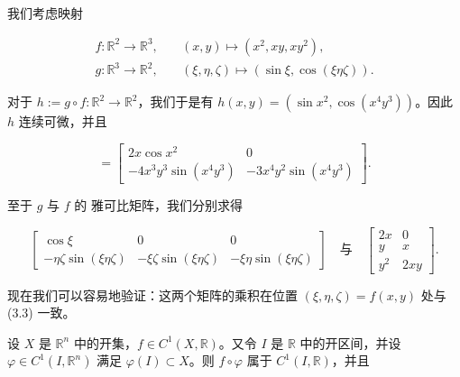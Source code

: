 \begin{example}

\begin{items}
\item

我们考虑映射

\begin{equation*}
\begin{aligned}
f : \mathbb{R}^2 \to \mathbb{R}^3 , &\quad (x, y) \mapsto (x^2, xy, xy^2) , \\ g : \mathbb{R}^3 \to \mathbb{R}^2 , &\quad (\xi, \eta, \zeta) \mapsto (\sin \xi, \cos(\xi \eta \zeta)) .
\end{aligned}
\end{equation*}

对于 $ h := g \circ f : \mathbb{R}^2 \to \mathbb{R}^2 $，我们于是有 $ h(x, y) = (\sin x^2, \cos(x^4y^3)) $。因此 $ h $ 连续可微，并且

\begin{equation}
[\partial h(x, y)] = \begin{bmatrix} 2x\cos x^2 & 0 \\ -4x^3y^3\sin(x^4y^3) & -3x^4y^2\sin(x^4y^3) \end{bmatrix} .\tag{3.3}
\end{equation}

至于 $ g $ 与 $ f $ 的 雅可比矩阵，我们分别求得

\begin{equation*}
\begin{bmatrix} \cos \xi & 0 & 0 \\ -\eta\zeta\sin(\xi \eta \zeta) & -\xi\zeta\sin(\xi \eta \zeta) & -\xi\eta\sin(\xi \eta \zeta) \end{bmatrix} \quad \text{与} \quad \begin{bmatrix} 2x & 0 \\ y & x \\ y^2 & 2xy \end{bmatrix} .
\end{equation*}

现在我们可以容易地验证：这两个矩阵的乘积在位置 $ (\xi, \eta, \zeta) = f(x, y) $ 处与 (3.3) 一致。

\item

设 $ X $ 是 $ \mathbb{R}^n $ 中的开集，$ f \in C^1(X, \mathbb{R}) $。又令 $ I $ 是 $ \mathbb{R} $ 中的开区间，并设 $ \varphi \in C^1(I, \mathbb{R}^n) $ 满足 $ \varphi(I) \subset X $。则 $ f \circ \varphi $ 属于 $ C^1(I, \mathbb{R}) $，并且


\end{items}
\end{example}
